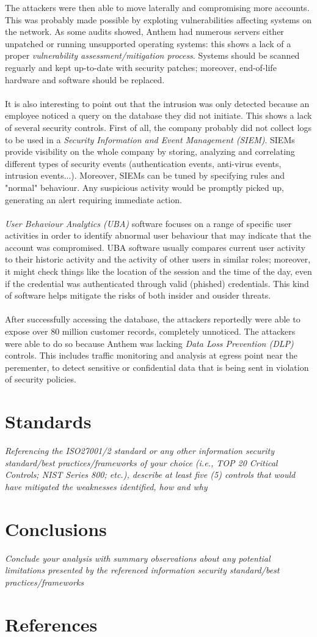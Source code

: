 \documentclass[12pt]{extarticle}
\begin{document}
	The attackers were then able to move laterally and compromising more accounts. This was probably made possible by exploting vulnerabilities affecting systems on the network. As some audits\cite{anthemAuditReport} showed, Anthem had numerous servers either unpatched or running unsupported operating systems: this shows a lack of a proper \textit{vulnerability assessment/mitigation process}. Systems should be scanned reguarly and kept up-to-date with security patches; moreover, end-of-life hardware and software should be replaced.\\\\ %
	It is also interesting to point out that the intrusion was only detected because an employee noticed a query on the database they did not initiate. This shows a lack of several security controls. First of all, the company probably did not collect logs to be used in a \textit{Security Information and Event Management (SIEM)}. SIEMs provide visibility on the whole company by storing, analyzing and correlating different types of security events (authentication events, anti-virus events, intrusion events...). Moreover, SIEMs can be tuned by specifying rules and "normal" behaviour. Any suspicious activity would be promptly picked up, generating an alert requiring immediate action. \\\\
	\textit{User Behaviour Analytics (UBA)} software focuses on a range of specific user activities \cite{uba} in order to identify abnormal user behaviour that may indicate that the account was compromised. UBA software usually compares current user activity to their historic activity and the activity of other users in similar roles; moreover, it might check things like the location of the session and the time of the day, even if the credential was authenticated through valid (phished) credentials. This kind of software helps mitigate the risks of both insider and ousider threats.\\\\
	After successfully accessing the database, the attackers reportedly were able to expose over 80 million customer records, completely unnoticed. The attackers were able to do so because Anthem was lacking \textit{Data Loss Prevention (DLP)} controls. This includes traffic monitoring and analysis at egress point near the perementer, to detect sensitive or confidential data that is being sent in violation of security policies.
	\newpage

	\section{Standards} 
	 \textit{Referencing the ISO27001/2 standard or any other information security standard/best practices/frameworks of your choice (i.e., TOP 20 Critical Controls; NIST Series 800; etc.), describe at least five (5) controls that would have mitigated the weaknesses identified, how and why}
	 \section{Conclusions}
	 \textit{Conclude your analysis with summary observations about any potential limitations presented by the referenced information security standard/best practices/frameworks}
	 
	\newpage
	\section{References}
	\printbibliography[heading=none]
\end{document}
